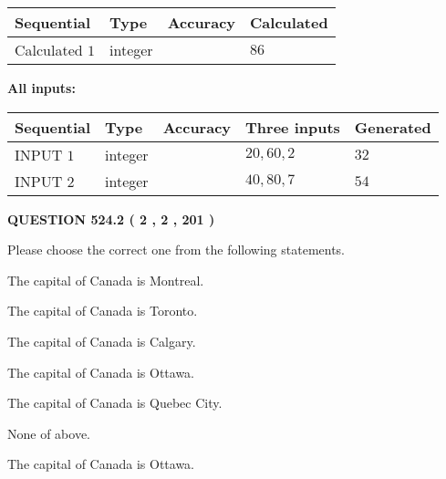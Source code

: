 \documentclass[12pt]{article}
\begin{document}
   
  
  
\noindent\begin{tabular}{|l|l|l|l|}
\hline
 Sequential & Type & Accuracy & Calculated \\ 
\hline
 
 
  Calculated $  1 $ & integer &  & 
  $ 86 $ 
 \\  \hline  
 \end{tabular}
   
   
   
   
\noindent\vspace{0.1in}\hspace{-0.08in} {\textbf{\Large{All inputs: }}}
   
   
  
  
\noindent\begin{tabular}{|l|l|l|l|l|}
\hline
 Sequential & Type & Accuracy & Three inputs & Generated \\ 
\hline
 
 
  INPUT $  1 $ & integer &  & $
 20
 , 
 60
 , 
 2
 $ & $ 32 $ 
 \\  \hline  
 
 
  INPUT $  2 $ & integer &  & $
 40
 , 
 80
 , 
 7
 $ & $ 54 $ 
 \\  \hline  
 \end{tabular}
   
   
  
\vspace{0.2in}
  
{\textbf{\Large{QUESTION
524.2 
 ( 2 , 2 , 201 )
}}}
  
  
Please choose the correct one from the following statements.
 
 
The capital of Canada is Montreal.
 
 
The capital of Canada is Toronto.
 
 
The capital of Canada is Calgary.
 
 
The capital of Canada is Ottawa.
 
 
The capital of Canada is Quebec City.
 
 
 None of above.
 
 
\noindent{}
 
 
The capital of Canada is Ottawa.
 
\end{document}
